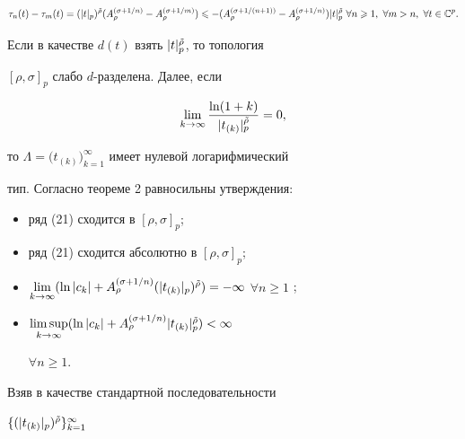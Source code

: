 $$


\tau_n(t)-\tau_m(t)=(|t|_p)^{\Tilde\rho}


(A^{(\sigma+1/n)}_{\rho}-A^{(\sigma+1/m)}_{\rho})\leqslant


-(A^{(\sigma+1/(n+1))}_{\rho}-A^{(\sigma+1/n)}_{\rho})


|t|_p^{\Tilde\rho}


\ \forall n\geqslant 1,\  \forall m>n,\  \forall t\in\Bbb C^p.


$$





Если в качестве $d(t)$ взять $|t|_p^{\Tilde\rho}$, то топология


$[\rho,\sigma]_p$ слабо $d$-разделена. Далее, если


\begin{equation}


\lim\limits_{k\to\infty}\dfrac{\ln(1+k)}


{|t_{(k)}|_p^{\Tilde\rho}}= 0,


\end{equation}


то $\Lambda=\bigl(t_{(k)}\bigr)^{\infty}_{k=1}$ имеет нулевой логарифмический


тип. Согласно теореме 2 равносильны утверждения:


\begin{itemize}


\item[1)] ряд (21) сходится в $[\rho,\sigma]_p$;


\item[2)] ряд (21) сходится абсолютно в $[\rho,\sigma]_p$;


\item[3)] $\lim\limits_{k\to\infty}(\ln|c_k|+


A^{(\sigma+1/n)}_{\rho}(|t_{(k)}|_p)^{\Tilde\rho})=


-\infty$ $\forall n\geqslant 1$ ;


\item[4)] $\limsup\limits_{k\to\infty}(\ln|c_k|+


A^{(\sigma+1/n)}_{\rho}|t_{(k)}|_p^{\Tilde\rho})<\infty$


$\forall n\geqslant 1$.


\end{itemize}


Взяв в качестве стандартной последовательности


$\{(|t_{(k)}|_p)^{\Tilde\rho}\}^{\infty}_{k=1}$


